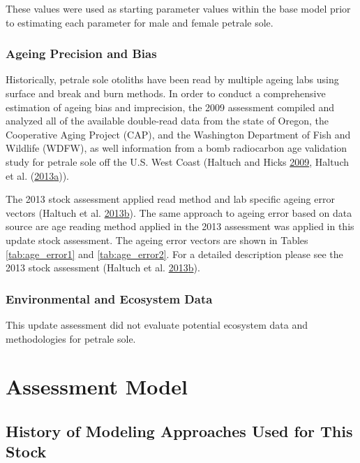 \documentclass[12pt,]{article}
\begin{document}
These values were used as starting parameter values within the base
model prior to estimating each parameter for male and female petrale
sole.

\subsubsection{Ageing Precision and
Bias}\label{ageing-precision-and-bias}

Historically, petrale sole otoliths have been read by multiple ageing
labs using surface and break and burn methods. In order to conduct a
comprehensive estimation of ageing bias and imprecision, the 2009
assessment compiled and analyzed all of the available double-read data
from the state of Oregon, the Cooperative Aging Project (CAP), and the
Washington Department of Fish and Wildlife (WDFW), as well information
from a bomb radiocarbon age validation study for petrale sole off the
U.S. West Coast (Haltuch and Hicks
\protect\hyperlink{ref-haltuch_status_2009}{2009}, Haltuch et al.
(\protect\hyperlink{ref-haltuch_california_2013}{2013}\protect\hyperlink{ref-haltuch_california_2013}{a})).

The 2013 stock assessment applied read method and lab specific ageing
error vectors (Haltuch et al.
\protect\hyperlink{ref-haltuch_status_2013}{2013}\protect\hyperlink{ref-haltuch_status_2013}{b}).
The same approach to ageing error based on data source are age reading
method applied in the 2013 assessment was applied in this update stock
assessment. The ageing error vectors are shown in Tables
\ref{tab:age_error1} and \ref{tab:age_error2}. For a detailed
description please see the 2013 stock assessment (Haltuch et al.
\protect\hyperlink{ref-haltuch_status_2013}{2013}\protect\hyperlink{ref-haltuch_status_2013}{b}).

\subsubsection{Environmental and Ecosystem
Data}\label{environmental-and-ecosystem-data}

This update assessment did not evaluate potential ecosystem data and
methodologies for petrale sole.

\section{Assessment Model}\label{assessment-model}

\subsection{History of Modeling Approaches Used for This
Stock}\label{history-of-modeling-approaches-used-for-this-stock}
\end{document}
